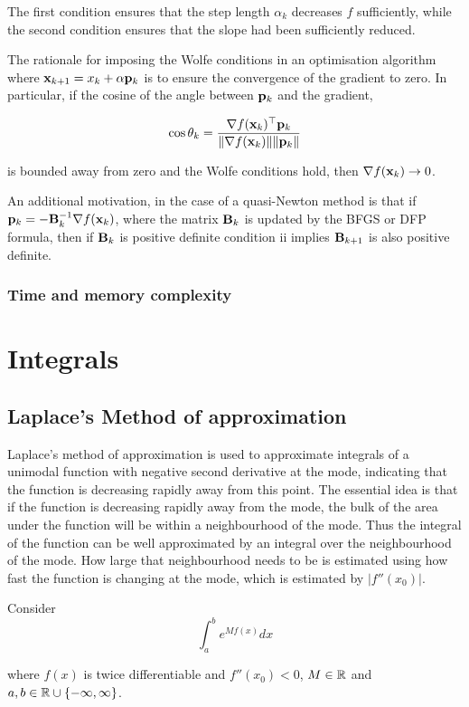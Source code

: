 \documentclass{amsart}[12pt]
\begin{document}
The first condition ensures that the step length $\alpha_k$ decreases $f$ sufficiently, while the second condition
ensures that the slope had been sufficiently reduced.

The rationale for imposing the Wolfe conditions in an optimisation algorithm where
${\bf x}_{k+1} = x_k + \alpha {\bf p}_k$ is to ensure the convergence of the gradient to zero. In particular, if the
cosine of the angle between ${\bf p}_k$ and the gradient,

$$
\cos \theta_k = \frac{\nabla f({\bf x}_k)^\top {\bf p}_k}{\|\nabla f({\bf x}_k)\| \|{\bf p}_k\|}
$$

is bounded away from zero and the Wolfe conditions hold, then $\nabla f({\bf x}_k) \to 0$.

An additional motivation, in the case of a quasi-Newton method is that if ${\bf p}_k = - {\bf B}_k^{-1} \nabla f({\bf x}_k)$,
where the matrix ${\bf B}_k$ is updated by the BFGS or DFP formula, then if ${\bf B}_k$ is positive definite condition ii
implies ${\bf B}_{k+1}$ is also positive definite.

\subsubsection{Time and memory complexity}

\section{Integrals}
\subsection{Laplace's Method of approximation}

Laplace's method of approximation is used to approximate integrals of a unimodal function with negative second
derivative at the mode, indicating that the function is decreasing rapidly away from this point. The essential
idea is that if the function is decreasing rapidly away from the mode, the bulk of the area under the function
will be within a neighbourhood of the mode. Thus the integral of the function can be well approximated by an
integral over the neighbourhood of the mode. How large that neighbourhood needs to be is estimated using
how fast the function is changing at the mode, which is estimated by $|f''(x_0)|$.

Consider
\[
	\int_a^b e^{M f(x)} dx
\]

where $f(x)$ is twice differentiable and $f''(x_0) < 0$, $M \in {\mathbb{R}}$ and $a, b \in {\mathbb{R}} \cup \{-\infty, \infty\}$.
\end{document}
